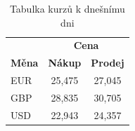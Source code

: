 \documentclass[a4paper, 11pt]{article}
\begin{document}
\bigskip
\begin{table}[h]
    \centering
    \begin{tabular}{| l | c | c |}
        \hline
                      & \multicolumn{2}{c|}{\textbf{Cena}}                   \\ \cline{2-3}
        \textbf{Měna} & \textbf{Nákup}                     & \textbf{Prodej} \\ \hline
        EUR           & 25,475                             & 27,045          \\
        GBP           & 28,835                             & 30,705          \\
        USD           & 22,943                             & 24,357          \\
        \hline
    \end{tabular}
    \caption{Tabulka kurzů k dnešnímu dni}
    \label{tab:kurzů}
\end{table}
\end{document}
